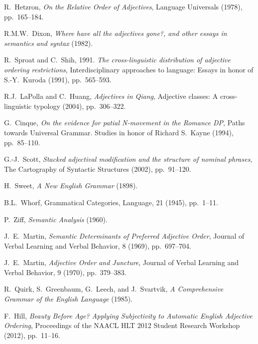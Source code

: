\documentclass{pnastwo}
\begin{document}
\begin{article}
\begin{thebibliography}{10}
	R.~Hetzron, {\em On the Relative Order of Adjectives}, Language Universals (1978), pp.~165--184.
	
	R.M.W.~Dixon, {\em Where have all the adjectives gone?, and other essays in semantics and syntax} (1982).
	
	R.~Sproat and C.~Shih, 1991. {\em The cross-linguistic distribution of adjective ordering restrictions}, Interdisciplinary approaches to language: Essays in honor of S.-Y.~Kuroda (1991), pp.~565--593.

	R.J.~LaPolla and C.~Huang, {\em Adjectives in Qiang}, Adjective classes: A cross-linguistic typology (2004), pp.~306--322.

	G.~Cinque, {\em On the evidence for patial N-movement in the Romance DP}, Paths towards Universal Grammar. Studies in honor of Richard S.~Kayne (1994), pp.~85--110.

	G.-J.~Scott, {\em Stacked adjectival modification and the structure of nominal phrases}, The Cartography of Syntactic Structures (2002), pp.~91--120.

	H.~Sweet, {\em A New English Grammar} (1898).
		
		
	B.L.~Whorf, Grammatical Categories, Language, 21 (1945), pp.~1--11. 
	
	P.~Ziff, {\em Semantic Analysis} (1960).
		
				
	J.~E.~Martin, {\em Semantic Determinants of Preferred Adjective Order}, Journal of Verbal Learning and Verbal Behavior, 8 (1969), pp.~697--704. 	
	
	J.~E.~Martin, {\em Adjective Order and Juncture}, Journal of Verbal Learning and Verbal Behavior, 9 (1970), pp.~379--383. 
	
	
	R.~Quirk, S.~Greenbaum, G.~Leech, and J.~Svartvik, {\em A Comprehensive Grammar of the English Language} (1985).
	
	F.~Hill, {\em Beauty Before Age? Applying Subjectivity to 	Automatic English Adjective Ordering}, Proceedings of the NAACL HLT 2012 Student Research Workshop (2012), pp.~11--16.
	

\end{thebibliography}
\end{article}
\end{document}

